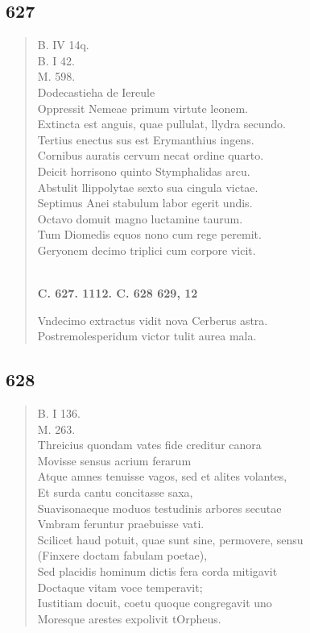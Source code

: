 \documentclass[11pt, a4paper]{report}
\begin{document}
            \subsection*{627}
      \begin{verse}
      B. IV 14q. \\ B. I 42. \\ M. 598. \\ Dodecastieha de Iereule \\ Oppressit Nemeae primum virtute leonem. \\ Extincta est anguis, quae pullulat, llydra secundo. \\ Tertius enectus sus est Erymanthius ingens. \\ Cornibus auratis cervum necat ordine quarto. \\ Deicit horrisono quinto Stymphalidas arcu. \\ Abstulit llippolytae sexto sua cingula victae. \\ Septimus Anei stabulum labor egerit undis. \\ Octavo domuit magno luctamine taurum. \\ Tum Diomedis equos nono cum rege peremit. \\ Geryonem decimo triplici cum corpore vicit. \\ 
        ﻿\pagebreak 
    \begin{center} \textbf{C. 627. 1112. C. 628 629, 12} \end{center} \marginpar{[96]} Vndecimo extractus vidit nova Cerberus astra. \\ Postremolesperidum victor tulit aurea mala. \\ 
      \end{verse}
  
            \subsection*{628}
      \begin{verse}
      B. I 136. \\ M. 263. \\ Threicius quondam vates fide creditur canora \\ Movisse sensus acrium ferarum \\ Atque amnes tenuisse vagos, sed et alites volantes, \\ Et surda cantu concitasse saxa, \\ Suavisonaeque moduos testudinis arbores secutae \\ Vmbram feruntur praebuisse vati. \\ Scilicet haud potuit, quae sunt sine, permovere, sensu \\ (Finxere doctam fabulam poetae), \\ Sed placidis hominum dictis fera corda mitigavit \\ Doctaque vitam voce temperavit; \\ Iustitiam docuit, coetu quoque congregavit uno \\ Moresque arestes expolivit tOrpheus. \\ 
      \end{verse}
  
\end{document}
